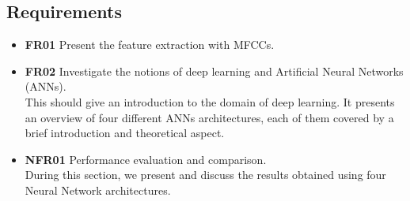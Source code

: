 
\subsection{Requirements}

\begin{itemize} 
  \item \textbf{FR01} Present the feature extraction with MFCCs. \\
  \item \textbf{FR02} Investigate the notions of deep learning and Artificial
    Neural Networks (ANNs).\\
    This should give an introduction to the domain of deep learning. It presents
    an overview of four different ANNs architectures, each of them covered by a
    brief introduction and theoretical
    aspect.\\
  \item \textbf{NFR01} Performance evaluation and comparison.\\ 
    During this section, we present and discuss the results obtained using four
    Neural Network architectures.
\end{itemize}

